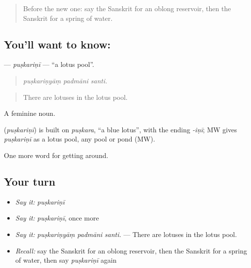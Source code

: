 \begin{quote}
Before the new one: say the Sanskrit for an oblong reservoir, then the Sanskrit for a spring of water.
\end{quote}

\subsection*{You'll want to know: }
\textbf{} — \emph{puṣkariṇī} — \textquotedblleft{}a lotus pool\textquotedblright{}.

\begin{quote}
  
\end{quote}

\begin{quote}
\emph{puṣkariṇyāṃ padmāni santi.}
\end{quote}

\begin{quote}
There are lotuses in the lotus pool.
\end{quote}

A feminine noun.

\begin{cousinweb}
\textbf{} (\emph{puṣkariṇī}) is built on \emph{puṣkara}, \textquotedblleft{}a blue lotus\textquotedblright{}, with the ending \emph{-iṇī}; MW gives \emph{puṣkariṇī} as a lotus pool, any pool or pond (MW).
\end{cousinweb}

\begin{grammarlens}[title={What you've built}]
One more word for getting around.
\end{grammarlens}

\subsection*{Your turn}
\begin{itemize}
\raggedright
  \item \emph{Say it:} \emph{puṣkariṇī}
  \item \emph{Say it:} \emph{puṣkariṇī}, once more
  \item \emph{Say it:} \emph{puṣkariṇyāṃ padmāni santi.} — There are lotuses in the lotus pool.
  \item \emph{Recall:} say the Sanskrit for an oblong reservoir, then the Sanskrit for a spring of water, then say \emph{puṣkariṇī} again
\end{itemize}

